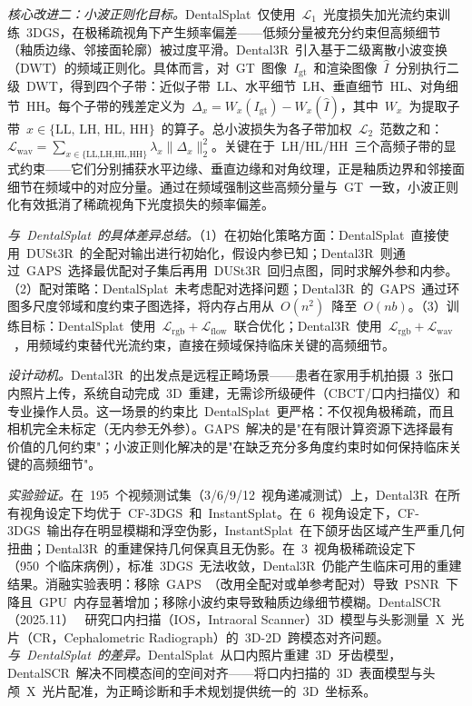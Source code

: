 \textit{核心改进二：小波正则化目标。}DentalSplat~仅使用~$\mathcal{L}_1$~光度损失加光流约束训练~3DGS，在极稀疏视角下产生频率偏差——低频分量被充分约束但高频细节（釉质边缘、邻接面轮廓）被过度平滑。Dental3R~引入基于二级离散小波变换（DWT）的频域正则化。具体而言，对~GT~图像~$I_{\text{gt}}$~和渲染图像~$\hat{I}$~分别执行二级~DWT，得到四个子带：近似子带~LL、水平细节~LH、垂直细节~HL、对角细节~HH。每个子带的残差定义为~$\Delta_x = W_x(I_{\text{gt}}) - W_x(\hat{I})$，其中~$W_x$~为提取子带~$x \in \{\text{LL, LH, HL, HH}\}$~的算子。总小波损失为各子带加权~$\mathcal{L}_2$~范数之和：$\mathcal{L}_{\text{wav}} = \sum_{x \in \{\text{LL,LH,HL,HH}\}} \lambda_x \|\Delta_x\|_2^2$。关键在于~LH/HL/HH~三个高频子带的显式约束——它们分别捕获水平边缘、垂直边缘和对角纹理，正是釉质边界和邻接面细节在频域中的对应分量。通过在频域强制这些高频分量与~GT~一致，小波正则化有效抵消了稀疏视角下光度损失的频率偏差。

\textit{与~DentalSplat~的具体差异总结。}（1）在初始化策略方面：DentalSplat~直接使用~DUSt3R~的全配对输出进行初始化，假设内参已知；Dental3R~则通过~GAPS~选择最优配对子集后再用~DUSt3R~回归点图，同时求解外参和内参。（2）配对策略：DentalSplat~未考虑配对选择问题；Dental3R~的~GAPS~通过环图多尺度邻域和度约束子图选择，将内存占用从~$O(n^2)$~降至~$O(nb)$。（3）训练目标：DentalSplat~使用~$\mathcal{L}_{\text{rgb}} + \mathcal{L}_{\text{flow}}$~联合优化；Dental3R~使用~$\mathcal{L}_{\text{rgb}} + \mathcal{L}_{\text{wav}}$~，用频域约束替代光流约束，直接在频域保持临床关键的高频细节。

\textit{设计动机。}Dental3R~的出发点是远程正畸场景——患者在家用手机拍摄~3~张口内照片上传，系统自动完成~3D~重建，无需诊所级硬件（CBCT/口内扫描仪）和专业操作人员。这一场景的约束比~DentalSplat~更严格：不仅视角极稀疏，而且相机完全未标定（无内参无外参）。GAPS~解决的是"在有限计算资源下选择最有价值的几何约束"；小波正则化解决的是"在缺乏充分多角度约束时如何保持临床关键的高频细节"。

\textit{实验验证。}在~195~个视频测试集（3/6/9/12~视角递减测试）上，Dental3R~在所有视角设定下均优于~CF-3DGS~和~InstantSplat。在~6~视角设定下，CF-3DGS~输出存在明显模糊和浮空伪影，InstantSplat~在下颌牙齿区域产生严重几何扭曲；Dental3R~的重建保持几何保真且无伪影。在~3~视角极稀疏设定下（950~个临床病例），标准~3DGS~无法收敛，Dental3R~仍能产生临床可用的重建结果。消融实验表明：移除~GAPS~（改用全配对或单参考配对）导致~PSNR~下降且~GPU~内存显著增加；移除小波约束导致釉质边缘细节模糊。DentalSCR（2025.11）~\cite{2511_14343} 研究口内扫描（IOS，Intraoral Scanner）3D~模型与头影测量~X~光片（CR，Cephalometric Radiograph）的~3D-2D~跨模态对齐问题。\textit{与~DentalSplat~的差异。}DentalSplat~从口内照片重建~3D~牙齿模型，DentalSCR~解决不同模态间的空间对齐——将口内扫描的~3D~表面模型与头颅~X~光片配准，为正畸诊断和手术规划提供统一的~3D~坐标系。

